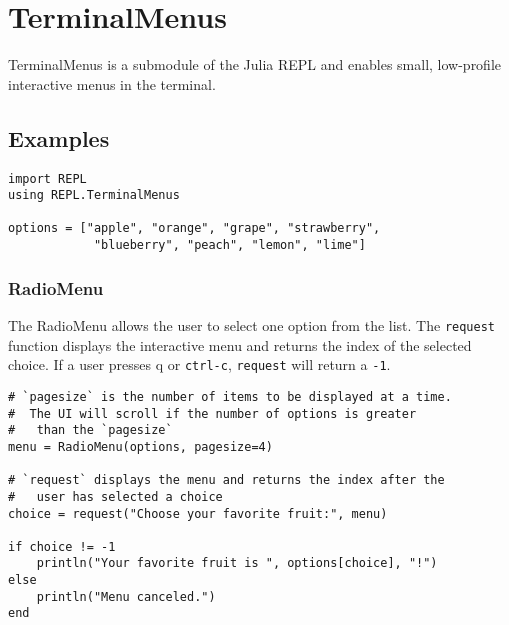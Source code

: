 \section{TerminalMenus}



TerminalMenus is a submodule of the Julia REPL and enables small, low-profile interactive menus in the terminal.



\hypertarget{15337950170852396133}{}


\subsection{Examples}




\begin{verbatim}
import REPL
using REPL.TerminalMenus

options = ["apple", "orange", "grape", "strawberry",
            "blueberry", "peach", "lemon", "lime"]

\end{verbatim}



\hypertarget{10421324822656120463}{}


\subsubsection{RadioMenu}



The RadioMenu allows the user to select one option from the list. The \texttt{request} function displays the interactive menu and returns the index of the selected choice. If a user presses {\textquotesingle}q{\textquotesingle} or \texttt{ctrl-c}, \texttt{request} will return a \texttt{-1}.




\begin{verbatim}
# `pagesize` is the number of items to be displayed at a time.
#  The UI will scroll if the number of options is greater
#   than the `pagesize`
menu = RadioMenu(options, pagesize=4)

# `request` displays the menu and returns the index after the
#   user has selected a choice
choice = request("Choose your favorite fruit:", menu)

if choice != -1
    println("Your favorite fruit is ", options[choice], "!")
else
    println("Menu canceled.")
end

\end{verbatim}



